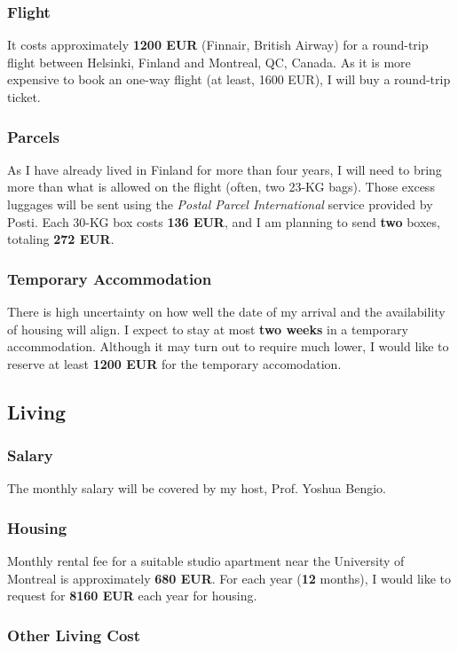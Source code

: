 \documentclass[11pt, oneside]{essay}
\begin{document}
\subsubsection{Flight}

It costs approximately \textbf{1200 EUR} (Finnair, British
Airway) for a round-trip flight between Helsinki, Finland
and Montreal, QC, Canada. As it is more expensive to book an
one-way flight (at least, 1600 EUR), I will buy a round-trip
ticket. 

\subsubsection{Parcels}

As I have already lived in Finland for more than four years,
I will need to bring more than what is allowed on the flight
(often, two 23-KG bags). Those excess luggages will be sent
using the \textit{Postal Parcel International} service
provided by Posti. Each 30-KG box costs \textbf{136 EUR},
and I am planning to send \textbf{two} boxes, totaling
\textbf{272 EUR}.

\subsubsection{Temporary Accommodation}

There is high uncertainty on how well the date of my arrival and
the availability of housing will align. I expect to stay at most
\textbf{two weeks} in a temporary accommodation. Although it may
turn out to require much lower, I would like to reserve at least
\textbf{1200 EUR} for the temporary accomodation.



\subsection{Living}

\subsubsection{Salary}

The monthly salary will be covered by my host, Prof. Yoshua Bengio.

\subsubsection{Housing}

Monthly rental fee for a suitable studio apartment near the
University of Montreal is approximately \textbf{680 EUR}. For
each year (\textbf{12} months), I would like to request for
\textbf{8160 EUR} each year for housing.

\subsubsection{Other Living Cost}








%
%
\end{document}
